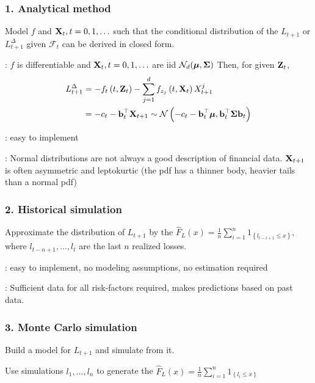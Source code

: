 \subsubsection*{1. Analytical method}
Model $f$ and $\boldsymbol{\mathbf{X}}_{t}, t=0,1, \ldots$ such that the conditional distribution of the  $L_{t+1}$ or  $L_{t+1}^{\Delta}$ given $\mathcal{F}_{t}$ can be derived in closed form.

: $f$ is differentiable and $\boldsymbol{\mathbf{X}}_{t}, t=0,1, \ldots$ are iid $\mathcal{N}_{d}(\boldsymbol{\mathbf{\mu}}, \boldsymbol{\mathbf{\Sigma}})$
Then, for given $\boldsymbol{\mathbf{Z}}_{t}$,
$$
\begin{aligned}
L_{t+1}^{\Delta}&=-f_{t}\left(t, \boldsymbol{\mathbf{Z}}_{t}\right)-\sum_{j=1}^{d} f_{z_j}\left(t, \boldsymbol{\mathbf{X}}_{t}\right) X_{t+1}^{j} \\
&=-c_{t}-\boldsymbol{\mathbf{b}}_{t}^{\top} \boldsymbol{\mathbf{X}}_{t+1} \sim \operatorname{\mathcal{N}}\left(-c_{t}-\boldsymbol{\mathbf{b}}_{t}^{\top} \boldsymbol{\mathbf{\mu}}, \boldsymbol{\mathbf{b}}_{t}^{\top} \boldsymbol{\mathbf{\Sigma}} \boldsymbol{\mathbf{b}}_{t}\right)
\end{aligned}
$$

: easy to implement

: Normal distributions are not always a good description of financial data. $\boldsymbol{\mathbf{X}}_{t+1}$ is often asymmetric and leptokurtic (the pdf has a thinner body, heavier tails than a normal pdf)

\subsubsection*{2. Historical simulation}
Approximate the distribution of $L_{t+1}$ by the 
$
\hat{F}_{L}(x)=\frac{1}{n} \sum_{i=1}^{n} 1_{\left\{l_{t-i+1} \leq x\right\}},
$
where $l_{t-n+1}, \ldots, l_{t}$ are the last $n$ realized losses.

: easy to implement, no modeling assumptions, no estimation required

: Sufficient data for all risk-factors required, makes predictions based on past data.

\subsubsection*{3. Monte Carlo simulation}
Build a model for $L_{t+1}$ and simulate from it.

Use simulations $l_{1}, \ldots, l_{n}$ to generate the 
$
\hat{F}_{L}(x)=\frac{1}{n} \sum_{i=1}^{n} 1_{\left\{l_{i} \leq x\right\}}
$

